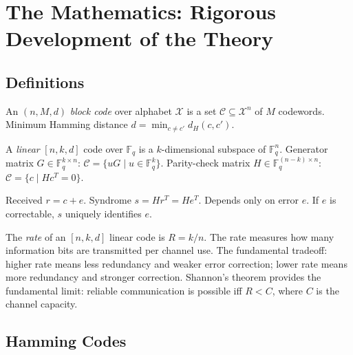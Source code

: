 \section{The Mathematics: Rigorous Development of the Theory}
\label{sec:ec:math}

\subsection{Definitions}
\label{sec:ec:definitions}

\begin{definition}
An $(n, M, d)$ \emph{block code} over alphabet $\mathcal{X}$ is a set $\mathcal{C} \subseteq \mathcal{X}^n$ of $M$ codewords. Minimum Hamming distance $d = \min_{c \neq c'} d_H(c, c')$.
\end{definition}

\begin{definition}
A \emph{linear} $[n, k, d]$ code over $\mathbb{F}_q$ is a $k$-dimensional subspace of $\mathbb{F}_q^n$. Generator matrix $G \in \mathbb{F}_q^{k \times n}$: $\mathcal{C} = \{ uG \mid u \in \mathbb{F}_q^k \}$. Parity-check matrix $H \in \mathbb{F}_q^{(n-k) \times n}$: $\mathcal{C} = \{ c \mid H c^T = 0 \}$.
\end{definition}

\begin{definition}
Received $r = c + e$. Syndrome $s = H r^T = H e^T$. Depends only on error $e$. If $e$ is correctable, $s$ uniquely identifies $e$.
\end{definition}

\begin{definition}
The \emph{rate} of an $[n,k,d]$ linear code is $R = k/n$. The rate measures how many information bits are transmitted per channel use. The fundamental tradeoff: higher rate means less redundancy and weaker error correction; lower rate means more redundancy and stronger correction. Shannon's theorem provides the fundamental limit: reliable communication is possible iff $R < C$, where $C$ is the channel capacity.
\end{definition}

\subsection{Hamming Codes}
\label{sec:ec:hamming}

